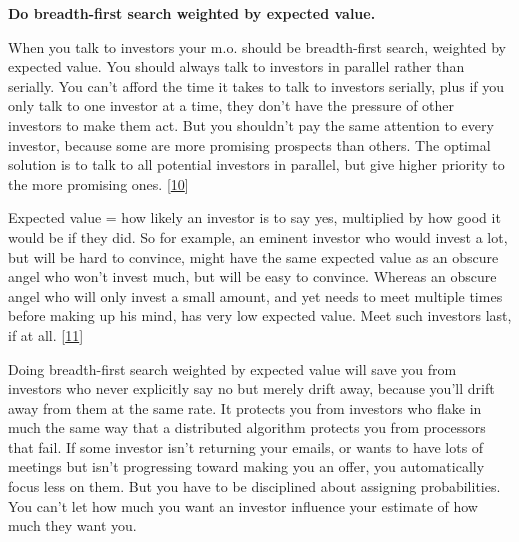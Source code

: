                     \textbf{Do breadth-first search weighted by expected value.}

When you talk to investors your m.o. should be
                    breadth-first search, weighted by expected value. You should
                    always talk to investors in parallel rather than serially.
                    You can't afford the time it takes to talk to investors
                    serially, plus if you only talk to one investor at a time,
                    they don't have the pressure of other investors to make them
                    act. But you shouldn't pay the same attention to every
                    investor, because some are more promising prospects than
                    others. The optimal solution is to talk to all potential
                    investors in parallel, but give higher priority to the more
                    promising ones.
                    [\href{\#f10n}{10}]

Expected value = how likely an investor is to
                    say yes, multiplied by how good it would be if they did. So
                    for example, an eminent investor who would invest a lot, but
                    will be hard to convince, might have the same expected value
                    as an obscure angel who won't invest much, but will be easy
                    to convince. Whereas an obscure angel who will only invest a
                    small amount, and yet needs to meet multiple times before
                    making up his mind, has very low expected value. Meet such
                    investors last, if at all.
                    [\href{\#f11n}{11}]

Doing breadth-first search weighted by expected
                    value will save you from investors who never explicitly say
                    no but merely drift away, because you'll drift away from
                    them at the same rate. It protects you from investors who
                    flake in much the same way that a distributed algorithm
                    protects you from processors that fail. If some investor
                    isn't returning your emails, or wants to have lots of
                    meetings but isn't progressing toward making you an offer,
                    you automatically focus less on them. But you have to be
                    disciplined about assigning probabilities. You can't let how
                    much you want an investor influence your estimate of how
                    much they want you.


